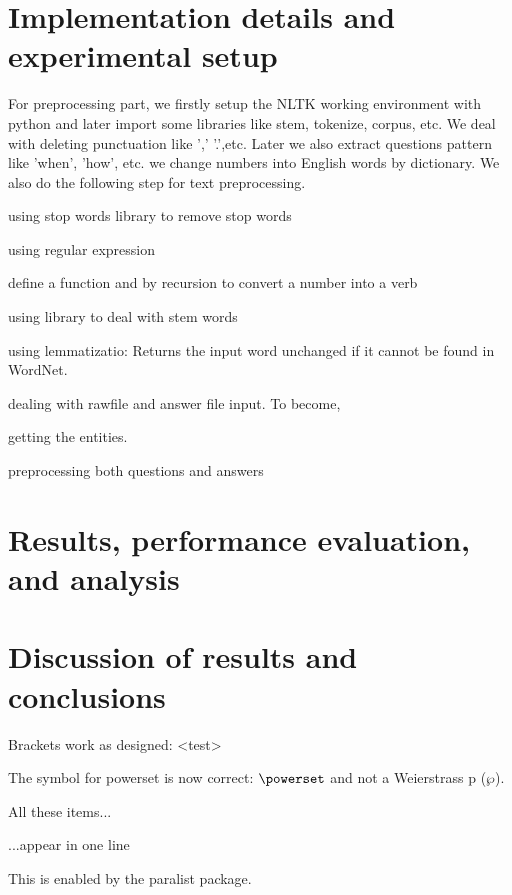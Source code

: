 \documentclass[runningheads,a4paper]{llncs}
\begin{document}
\section{Implementation details and experimental setup}
For preprocessing part, we firstly setup the NLTK working environment with python and later import some libraries like stem, tokenize, corpus, etc. We deal with deleting punctuation like ',' '.',etc. Later we also extract questions pattern like 'when', 'how', etc. we change numbers into English words by dictionary. We also do the following step for text preprocessing. 


\begin{inparaenum}
	\item using stop words library to remove stop words
	\item using regular expression
	\item define a function and by recursion to convert a number into a verb
	\item using library to deal with stem words
	\item using lemmatizatio: Returns the input word unchanged if it cannot be found in WordNet.
	\item dealing with rawfile and answer file input. To become,
	\item getting the entities.
	\item preprocessing both questions and answers
\end{inparaenum}


\section{Results, performance evaluation, and analysis}

\section{Discussion of results and conclusions}






Brackets work as designed:
<test>

The symbol for powerset is now correct: $\powerset$ and not a Weierstrass p ($\wp$).

\begin{inparaenum}
\item All these items...
\item ...appear in one line
\item This is enabled by the paralist package.
\end{inparaenum}
\end{document}
